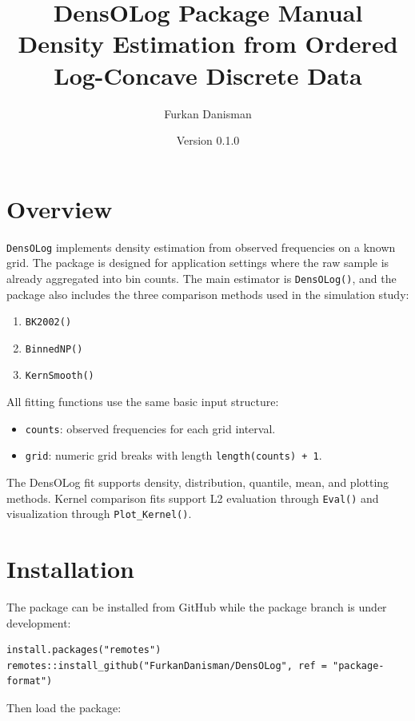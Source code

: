 \documentclass[11pt]{article}
\title{\textbf{DensOLog Package Manual}\\
\large Density Estimation from Ordered Log-Concave Discrete Data}
\author{Furkan Danisman}
\date{Version 0.1.0}
\begin{document}
\maketitle

\tableofcontents
\newpage

\section{Overview}

\texttt{DensOLog} implements density estimation from observed frequencies on a
known grid. The package is designed for application settings where the raw
sample is already aggregated into bin counts. The main estimator is
\texttt{DensOLog()}, and the package also includes the three comparison methods
used in the simulation study:

\begin{enumerate}
  \item \texttt{BK2002()}
  \item \texttt{BinnedNP()}
  \item \texttt{KernSmooth()}
\end{enumerate}

All fitting functions use the same basic input structure:

\begin{itemize}
  \item \texttt{counts}: observed frequencies for each grid interval.
  \item \texttt{grid}: numeric grid breaks with length \texttt{length(counts) + 1}.
\end{itemize}

The DensOLog fit supports density, distribution, quantile, mean, and plotting
methods. Kernel comparison fits support L2 evaluation through \texttt{Eval()}
and visualization through \texttt{Plot\_Kernel()}.

\section{Installation}

The package can be installed from GitHub while the package branch is under
development:

\begin{lstlisting}
install.packages("remotes")
remotes::install_github("FurkanDanisman/DensOLog", ref = "package-format")
\end{lstlisting}

Then load the package:
\end{document}
